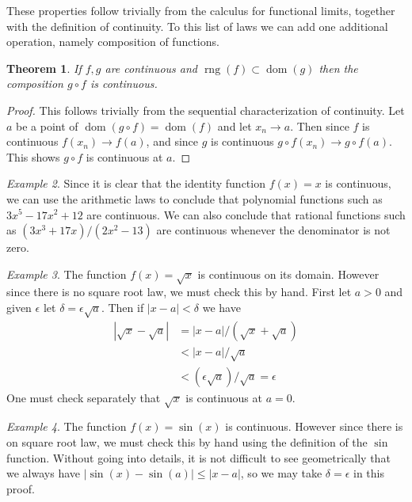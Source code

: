 \documentclass[11pt,oneside]{amsbook}
\DeclareMathOperator{\dom}{dom}
\DeclareMathOperator{\rng}{rng}
\theoremstyle{definition}
\theoremstyle{plain}
\newtheorem{thm}{Theorem}[section]
\theoremstyle{definition}
\theoremstyle{remark}
\newtheorem{example}[thm]{Example}
\numberwithin{equation}{section}
\numberwithin{figure}{section}
\begin{document}
These properties follow trivially from the calculus for functional limits, together with the definition of continuity. To this list of laws we can add one additional operation, namely composition of functions.

\begin{thm}
  If $f,g$ are continuous and $\rng(f)\subset\dom(g)$ then the composition $g\circ f$ is continuous.
\end{thm}

\begin{proof}
  This follows trivially from the sequential characterization of continuity. Let $a$ be a point of $\dom(g\circ f)=\dom(f)$ and let $x_n\to a$. Then since $f$ is continuous $f(x_n)\to f(a)$, and since $g$ is continuous $g\circ f(x_n)\to g\circ f(a)$. This shows $g\circ f$ is continuous at $a$.
\end{proof}

\begin{example}
  Since it is clear that the identity function $f(x)=x$ is continuous, we can use the arithmetic laws to conclude that polynomial functions such as $3x^5-17x^2+12$ are continuous. We can also conclude that rational functions such as $(3x^3+17x)/(2x^2-13)$ are continuous whenever the denominator is not zero.
\end{example}

\begin{example}
  The function $f(x)=\sqrt{x}$ is continuous on its domain. However since there is no square root law, we must check this by hand. First let $a>0$ and given $\epsilon$ let $\delta=\epsilon\sqrt{a}$. Then if $|x-a|<\delta$ we have
  \begin{align*}
    |\sqrt{x}-\sqrt{a}|&=|x-a|/(\sqrt{x}+\sqrt{a})\\
                       &<|x-a|/\sqrt{a}\\
                       &<(\epsilon\sqrt{a})/\sqrt{a}=\epsilon
  \end{align*}
  One must check separately that $\sqrt{x}$ is continuous at $a=0$.
\end{example}

\begin{example}
  The function $f(x)=\sin(x)$ is continuous. However since there is on square root law, we must check this by hand using the definition of the $\sin$ function. Without going into details, it is not difficult to see geometrically that we always have $|\sin(x)-\sin(a)|\leq|x-a|$, so we may take $\delta=\epsilon$ in this proof.
\end{example}
\end{document}
